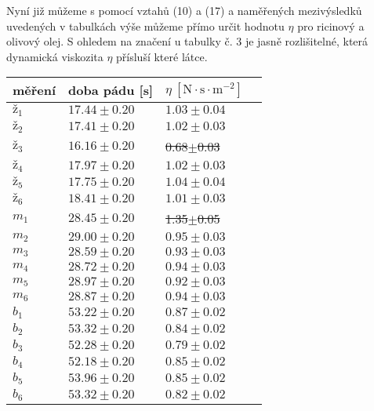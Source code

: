 \documentclass[a4paper]{article}
\begin{document}
\par Nyní již můžeme s pomocí vztahů (10) a (17) a naměřených mezivýsledků uvedených v tabulkách výše můžeme přímo určit hodnotu $\eta$ pro ricinový a olivový olej. S ohledem na značení u tabulky č. 3 je jasně rozlišitelné, která dynamická viskozita $\eta$ přísluší které látce.
\begin{center}
     \label{tab:title}
    \begin{tabular}{ | l | l | l | p{3cm} |} \hline
    měření & doba pádu [s]  & $\eta \: \mathrm{[N \cdot s \cdot m^{-2}]}$ \\ \hline
    $\textit{ž}_{1}$       & $17.44\pm0.20$ & $1.03\pm0.04$ \\ \hline
    $\textit{ž}_{2}$       & $17.41\pm0.20$ & $1.02\pm0.03$  \\ \hline
    $\textit{ž}_{3}$       & $16.16\pm0.20$ & \st{0.68}$\pm$\st{0.03}  \\ \hline
    $\textit{ž}_{4}$       & $17.97\pm0.20$ & $1.02\pm0.03$  \\ \hline
    $\textit{ž}_{5}$       & $17.75\pm0.20$ & $1.04\pm0.04$   \\ \hline
    $\textit{ž}_{6}$       & $18.41\pm0.20$ & $1.01\pm0.03$   \\ \hline
    $m_{1}$       & $28.45\pm0.20$ & \st{1.35}$\pm$\st{0.05} \\ \hline
    $m_{2}$       & $29.00\pm0.20$ & $0.95\pm0.03$ \\ \hline
    $m_{3}$       & $28.59\pm0.20$ & $0.93\pm0.03$ \\ \hline
    $m_{4}$       & $28.72\pm0.20$ & $0.94\pm0.03$ \\ \hline
    $m_{5}$       & $28.97\pm0.20$ & $0.92\pm0.03$ \\ \hline
    $m_{6}$       & $28.87\pm0.20$ & $0.94\pm0.03$ \\ \hline
    $b_{1}$       & $53.22\pm0.20$ & $0.87\pm0.02$ \\ \hline
    $b_{2}$       & $53.32\pm0.20$ & $0.84\pm0.02$ \\ \hline
    $b_{3}$       & $52.28\pm0.20$ & $0.79\pm0.02$ \\ \hline
    $b_{4}$       & $52.18\pm0.20$ & $0.85\pm0.02$ \\ \hline
    $b_{5}$       & $53.96\pm0.20$ & $0.85\pm0.02$ \\ \hline
    $b_{6}$       & $53.32\pm0.20$ & $0.82\pm0.02$ \\ \hline

\end{tabular}
\end{center}
\end{document}
